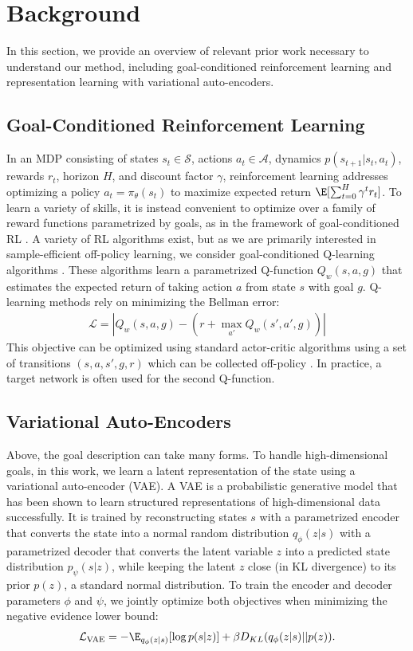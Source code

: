 \section{Background}

In this section, we provide an overview of relevant prior work necessary to understand our method, including goal-conditioned reinforcement learning and representation learning with variational auto-encoders.

\subsection{Goal-Conditioned Reinforcement Learning}
In an MDP consisting of states $s_t \in \mathcal S$, actions $a_t \in \mathcal A$, dynamics $p(s_{t+1}|s_t, a_t)$, rewards $r_t$, horizon $H$, and discount factor $\gamma$, reinforcement learning addresses optimizing a policy $a_t = \pi_\theta(s_t)$ to maximize expected return $\E[\sum_{t=0}^{H} \gamma^t r_t]$. To learn a variety of skills, it is instead convenient to optimize over a family of reward functions parametrized by goals, as in the framework of goal-conditioned RL \cite{kaelbling1993goals}. A variety of RL algorithms exist, but as we are primarily interested in sample-efficient off-policy learning, we consider goal-conditioned Q-learning algorithms \cite{schaul2015uva}. These algorithms learn a parametrized Q-function $Q_w(s, a, g)$ that estimates the expected return of taking action $a$ from state $s$ with goal $g$. Q-learning methods rely on minimizing the Bellman error:
\begin{align} \label{eq:bellman}
    \mathcal{L} = |Q_w(s, a, g) - (r + \max_{a'} Q_w(s', a', g))|
\end{align}
This objective can be optimized using standard actor-critic algorithms using a set of transitions $(s, a, s', g, r)$ which can be collected off-policy \cite{lillicrap2015continuous}.
In practice, a target network is often used for the second Q-function.

\subsection{Variational Auto-Encoders}
Above, the goal description can take many forms. To handle high-dimensional goals, in this work, we learn a latent representation of the state using a variational auto-encoder (VAE).
A VAE is a probabilistic generative model that has been shown to learn structured representations of high-dimensional data \cite{kingma2014vae} successfully. It is trained by reconstructing states $s$ with a parametrized encoder that converts the state into a normal random distribution $q_\phi(z|s)$ with a parametrized decoder that converts the latent variable $z$ into a predicted state distribution $p_\psi(s|z)$, while keeping the latent $z$ close (in KL divergence) to its prior $p(z)$, a standard normal distribution. To train the encoder and decoder parameters $\phi$ and $\psi$, we jointly optimize both objectives when minimizing the negative evidence lower bound:
\begin{align}
    \mathcal L_\text{VAE} = -\E_{q_\phi(z|s)} [\log p(s|z)] + \beta D_{KL}(q_\phi(z|s)||p(z)).
\end{align}

